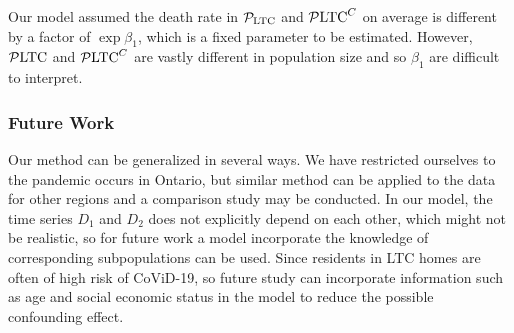 \documentclass[12pt]{article}
\begin{document}
Our model assumed the death rate in $\mathcal P_{\mathrm{LTC}}$ and $\mathcal P \mathrm{LTC}^C$ on average is different by a factor of $\exp{\beta_1}$, which is a fixed parameter to be estimated. However, $\mathcal P \mathrm{LTC}$ and $\mathcal P \mathrm{LTC}^C$ are vastly different in population size and so $\beta_1$ are difficult to interpret.

\subsubsection{Future Work}
Our method can be generalized in several ways. We have restricted ourselves to the pandemic occurs in Ontario, but similar method can be applied to the data for other regions and a comparison 
study may be conducted. In our model, the time series $D_1$ and $D_2$ does not explicitly depend on each other, which might not be realistic, so for future work a model incorporate the knowledge of corresponding subpopulations can be used. Since residents in LTC homes are often of high risk of CoViD-19, so future study can incorporate information such as age and social economic status in the model to reduce the possible confounding effect.










\newpage
%



\end{document}
